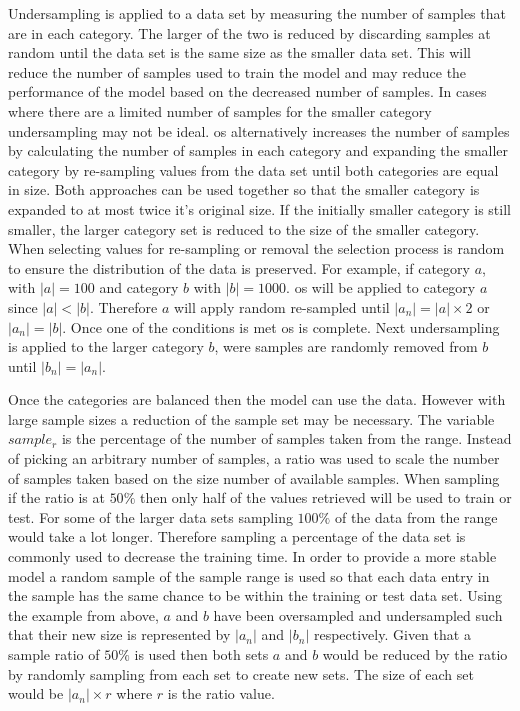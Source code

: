 Undersampling is applied to a data set by measuring the number of samples that are in each category. The larger of the two is reduced by discarding samples at random until the data set is the same size as the smaller data set. This will reduce the number of samples used to train the model and may reduce the performance of the model based on the decreased number of samples. In cases where there are a limited number of samples for the smaller category undersampling may not be ideal. \gls{os} alternatively increases the number of samples by calculating the number of samples in each category and expanding the smaller category by re-sampling values from the data set until both categories are equal in size. Both approaches can be used together so that the smaller category is expanded to at most twice it's original size. If the initially smaller category is still smaller, the larger category set is reduced to the size of the smaller category. When selecting values for re-sampling or removal the selection process is random to ensure the distribution of the data is preserved. For example, if category $a$, with $|a| = 100$ and category $b$ with $|b| = 1000$. \gls{os} will be applied to category $a$ since $|a| < |b|$. Therefore $a$ will apply random re-sampled until $|a_n| = |a| \times 2$ or $|a_n| = |b|$. Once one of the conditions is met \gls{os} is complete. Next undersampling is applied to the larger category $b$, were samples are randomly removed from $b$ until $|b_n| = |a_n|$.

Once the categories are balanced then the model can use the data. However with large sample sizes a reduction of the sample set may be necessary. The variable $sample_r$ is the percentage of the number of samples taken from the range. Instead of picking an arbitrary number of samples, a ratio was used to scale the number of samples taken based on the size number of available samples. When sampling if the ratio is at $50\%$ then only half of the values retrieved will be used to train or test. For some of the larger data sets sampling $100\%$ of the data from the range would take a lot longer. Therefore sampling a percentage of the data set is commonly used to decrease the training time. In order to provide a more stable model a random sample of the sample range is used so that each data entry in the sample has the same chance to be within the training or test data set. Using the example from above, $a$ and $b$ have been oversampled and undersampled such that their new size is represented by $|a_n|$ and $|b_n|$ respectively. Given that a sample ratio of $50\%$ is used then both sets $a$ and $b$ would be reduced by the ratio by randomly sampling from each set to create new sets. The size of each set would be $|a_n| \times r$ where $r$ is the ratio value.

